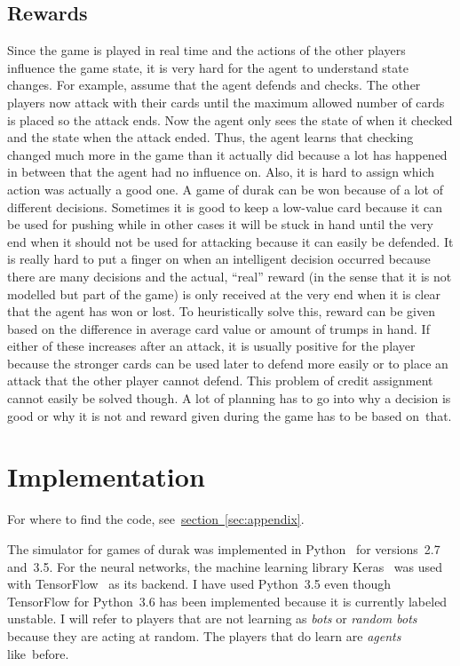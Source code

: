 \documentclass[a4paper,titlepage]{article}
\begin{document}
\subsection{Rewards}

Since the game is played in real time and the actions of the other players influence the game state, it is very hard for the agent to understand state changes. For example, assume that the agent defends and checks. The other players now attack with their cards until the maximum allowed number of cards is placed so the attack ends. Now the agent only sees the state of when it checked and the state when the attack ended. Thus, the agent learns that checking changed much more in the game than it actually did because a lot has happened in between that the agent had no influence on. Also, it is hard to assign which action was actually a good one. A game of durak can be won because of a lot of different decisions. Sometimes it is good to keep a low-value card because it can be used for pushing while in other cases it will be stuck in hand until the very end when it should not be used for attacking because it can easily be defended. It is really hard to put a finger on when an intelligent decision occurred because there are many decisions and the actual, ``real'' reward (in the sense that it is not modelled but part of the game) is only received at the very end when it is clear that the agent has won or lost. To heuristically solve this, reward can be given based on the difference in average card value or amount of trumps in hand. If either of these increases after an attack, it is usually positive for the player because the stronger cards can be used later to defend more easily or to place an attack that the other player cannot defend. This problem of credit assignment cannot easily be solved though. A lot of planning has to go into why a decision is good or why it is not and reward given during the game has to be based on~that.

\newpage

\section{Implementation}

For where to find the code, see~\hyperref[sec:appendix]{section~\ref*{sec:appendix}}.

The simulator for games of durak was implemented in Python~\cite{python} for versions~2.7 and~3.5. For the neural networks, the machine learning library Keras~\cite{keras} was used with {TensorFlow}~\cite{tensorflow}  as its backend. I have used Python~3.5 even though TensorFlow for Python~3.6 has been implemented because it is currently labeled unstable. I will refer to players that are not learning as \emph{bots} or \emph{random bots} because they are acting at random. The players that do learn are \emph{agents} like~before.
\end{document}
